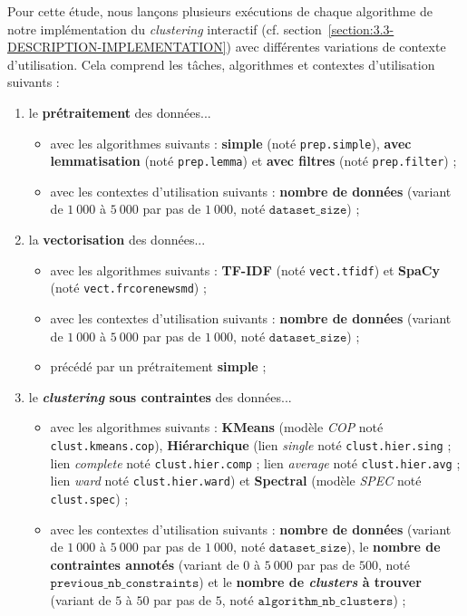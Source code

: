 			Pour cette étude, nous lançons plusieurs exécutions de chaque algorithme de notre implémentation du \textit{clustering} interactif (cf. section~\ref{section:3.3-DESCRIPTION-IMPLEMENTATION}) avec différentes variations de contexte d'utilisation. Cela comprend les tâches, algorithmes et contextes d'utilisation suivants :
			\begin{enumerate}
				\item le \textbf{prétraitement} des données...
					\begin{itemize}
						\item avec les algorithmes suivants : \textbf{simple} (noté \texttt{prep.simple}), \textbf{avec lemmatisation} (noté \texttt{prep.lemma}) et \textbf{avec filtres} (noté \texttt{prep.filter}) ;
						\item avec les contextes d'utilisation suivants : \textbf{nombre de données} (variant de $1~000$ à $5~000$ par pas de $1~000$, noté $\texttt{dataset\_size}$) ;
					\end{itemize}
				\item la \textbf{vectorisation} des données...
					\begin{itemize}
						\item avec les algorithmes suivants : \textbf{TF-IDF} (noté \texttt{vect.tfidf}) et \textbf{SpaCy} (noté \texttt{vect.frcorenewsmd}) ;
						\item avec les contextes d'utilisation suivants : \textbf{nombre de données} (variant de $1~000$ à $5~000$ par pas de $1~000$, noté $\texttt{dataset\_size}$) ;
						\item précédé par un prétraitement \textbf{simple} ;
					\end{itemize}
				\item le \textbf{\textit{clustering} sous contraintes} des données...
					\begin{itemize}
						\item avec les algorithmes suivants : \textbf{KMeans} (modèle \textit{COP} noté \texttt{clust.kmeans.cop}), \textbf{Hiérarchique} (lien \textit{single} noté \texttt{clust.hier.sing} ; lien \textit{complete} noté \texttt{clust.hier.comp} ; lien \textit{average} noté \texttt{clust.hier.avg} ; lien \textit{ward} noté \texttt{clust.hier.ward}) et \textbf{Spectral} (modèle \textit{SPEC} noté \texttt{clust.spec}) ;
						\item avec les contextes d'utilisation suivants : \textbf{nombre de données} (variant de $1~000$ à $5~000$ par pas de $1~000$, noté $\texttt{dataset\_size}$), le \textbf{nombre de contraintes annotés} (variant de $0$ à $5~000$ par pas de $500$, noté $\texttt{previous\_nb\_constraints}$) et le \textbf{nombre de \textit{clusters} à trouver} (variant de $5$ à $50$ par pas de $5$, noté $\texttt{algorithm\_nb\_clusters}$) ;

\end{itemize}
\end{enumerate}

